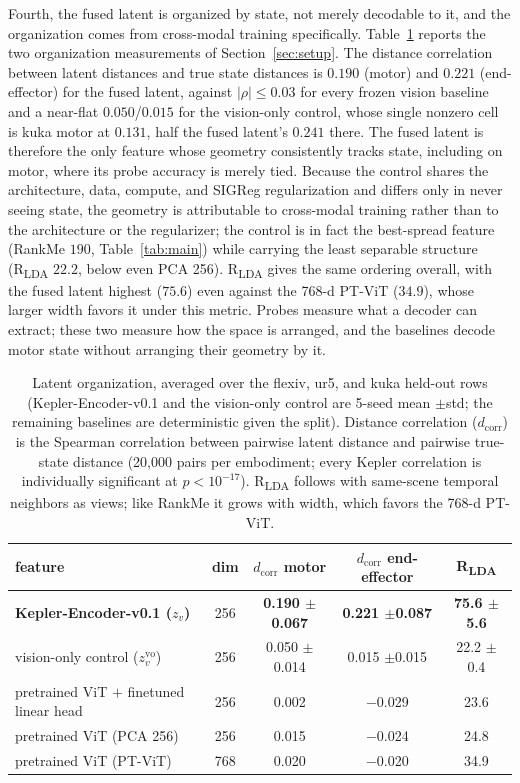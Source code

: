 \documentclass{article}
\begin{document}
Fourth, the fused latent is organized by state, not merely decodable to it, and the organization comes from cross-modal training specifically. Table~\ref{tab:geometry} reports the two organization measurements of Section~\ref{sec:setup}. The distance correlation between latent distances and true state distances is $0.190$ (motor) and $0.221$ (end-effector) for the fused latent, against $|\rho|\le0.03$ for every frozen vision baseline and a near-flat $0.050$/$0.015$ for the vision-only control, whose single nonzero cell is kuka motor at $0.131$, half the fused latent's $0.241$ there. The fused latent is therefore the only feature whose geometry consistently tracks state, including on motor, where its probe accuracy is merely tied. Because the control shares the architecture, data, compute, and SIGReg regularization and differs only in never seeing state, the geometry is attributable to cross-modal training rather than to the architecture or the regularizer; the control is in fact the best-spread feature (RankMe $190$, Table~\ref{tab:main}) while carrying the least separable structure (R\textsubscript{LDA} $22.2$, below even PCA 256). R\textsubscript{LDA} gives the same ordering overall, with the fused latent highest ($75.6$) even against the 768-d PT-ViT ($34.9$), whose larger width favors it under this metric. Probes measure what a decoder can extract; these two measure how the space is arranged, and the baselines decode motor state without arranging their geometry by it.

\begin{table}[!htbp]
  \centering
  \small
  \caption{Latent organization, averaged over the flexiv, ur5, and kuka held-out
  rows (Kepler-Encoder-v0.1 and the vision-only control are 5-seed mean $\pm$std; the remaining baselines are deterministic given the split). Distance correlation ($d_{\mathrm{corr}}$) is the Spearman correlation between pairwise latent distance and pairwise true-state distance (20{,}000 pairs per embodiment; every Kepler correlation is individually significant at $p<10^{-17}$). R\textsubscript{LDA} follows \citet{jepamsac2026} with same-scene temporal neighbors as views; like RankMe it grows with width, which favors the 768-d PT-ViT.}
  \label{tab:geometry}
  \begin{tabular}{lcccc}
    \toprule
    feature & dim & $d_{\mathrm{corr}}$ motor & $d_{\mathrm{corr}}$ end-effector & R\textsubscript{LDA} \\
    \midrule
    \textbf{Kepler-Encoder-v0.1 ($z_v$)}     & 256 & \textbf{0.190 $\pm$0.067} & \textbf{0.221 $\pm$0.087} & \textbf{75.6 $\pm$5.6} \\
    vision-only control ($z_v^{\mathrm{vo}}$) & 256 & 0.050 $\pm$0.014 & 0.015 $\pm$0.015 & 22.2 $\pm$0.4 \\
    pretrained ViT $+$ finetuned linear head & 256 & 0.002 & $-$0.029 & 23.6 \\
    pretrained ViT (PCA 256)                 & 256 & 0.015 & $-$0.024 & 24.8 \\
    pretrained ViT (PT-ViT)                  & 768 & 0.020 & $-$0.020 & 34.9 \\
    \bottomrule
  \end{tabular}
\end{table}
\end{document}
